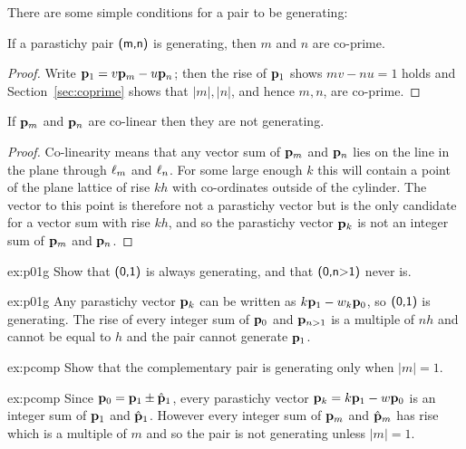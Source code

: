 There are some simple conditions for a pair to be generating:
\begin{theorem}
	\label{thm:coprime1}
	If a parastichy pair $\textsf{(m,n)}$ is generating, then $m$ and $n$ are co-prime.  
\end{theorem}
\begin{proof}
	Write ${\mathbf p}_{1}= v{\mathbf p}_{m}-u{\mathbf p}_{n}$; then the rise of ${\mathbf p}_{1}$ shows $mv-nu = 1$ holds and Section~\ref{sec:coprime} shows that $|m|,|n|$, and hence $m,n$, are co-prime.
\end{proof}
\begin{theorem}
	\label{thm:coprime}
	If ${\mathbf p}_{m}$ and ${\mathbf p}_{n}$ are co-linear then they are not generating.
\end{theorem}
\begin{proof}
	Co-linearity means that any vector sum of ${\mathbf p}_{m}$ and ${\mathbf p}_{n}$ lies on the line in the plane through $\ell_{{m}}$ and $\ell_{{n}}$. For some large enough $k$ this will contain a point of the plane lattice of rise $kh$ with co-ordinates outside of the cylinder. The vector to this point is therefore not a parastichy vector but is the only candidate for a vector sum with rise $kh$, and so the parastichy vector ${\mathbf p}_{k}$ is not an integer sum of ${\mathbf p}_{m}$ and ${\mathbf p}_{n}$.
\end{proof}
\begin{jExercise}{ex:p01g}
	\label{ex:01generating}
	Show that $\textsf{(0,1)}$ is always generating, and that  $\textsf{(0,n>1)}$ never is. 
\end{jExercise}
\begin{jAnswer}{ex:p01g}
	Any parastichy vector ${\mathbf p}_{k}$ can be written as $k{\mathbf p}_{1}-w_k {\mathbf p}_{0}$, so $\textsf{(0,1)}$ is generating. The rise of every integer sum of ${\mathbf p}_{0}$ and ${\mathbf p}_{n>1}$ is a multiple of $nh$ and cannot be equal to $h$ and the pair cannot generate ${\mathbf p}_{1}$.
	
\end{jAnswer}
\begin{jExercise}{ex:pcomp}
	Show that the complementary pair  is generating only when $|m|=1$.
\end{jExercise}
\begin{jAnswer}{ex:pcomp}
	Since ${\mathbf p}_{0}={\mathbf p}_{1}\pm\hat{\mathbf p}_{1}$, every parastichy vector ${\mathbf p}_{k}=k{\mathbf p}_{1}-w{\mathbf p}_{0}$ is an integer sum of ${\mathbf p}_{1}$ and $\hat{\mathbf p}_{1}$. However every integer sum of
	${\mathbf p}_{m}$ and $\hat{\mathbf p}_{m}$ has rise which is a multiple of $m$ and so the pair is not generating unless $|m|=1$. 
\end{jAnswer}



